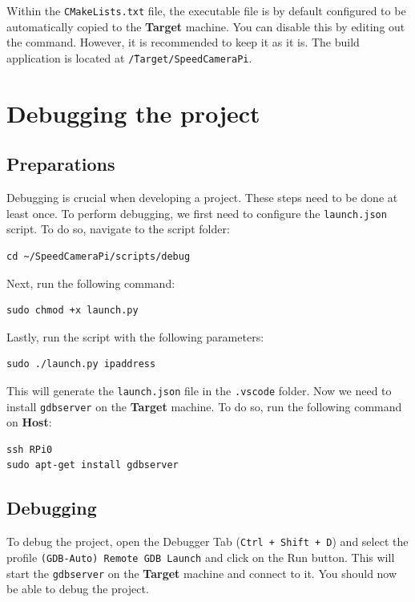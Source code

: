 Within the \texttt{CMakeLists.txt} file, the executable file is by default configured to be automatically copied to the \textbf{Target} machine. You can disable this by editing out the command. However, it is recommended to keep it as it is. The build application is located at \texttt{\~/Target/SpeedCameraPi}.

\section{Debugging the project}

\subsection{Preparations}

Debugging is crucial when developing a project. These steps need to be done at least once. To perform debugging, we first need to configure the \texttt{launch.json} script. To do so, navigate to the script folder:

\begin{lstlisting}
cd ~/SpeedCameraPi/scripts/debug
\end{lstlisting}

Next, run the following command:

\begin{lstlisting}
sudo chmod +x launch.py
\end{lstlisting}

Lastly, run the script with the following parameters:

\begin{lstlisting}
sudo ./launch.py ipaddress
\end{lstlisting}

This will generate the \texttt{launch.json} file in the \texttt{.vscode} folder. Now we need to install \texttt{gdbserver} on the \textbf{Target} machine. To do so, run the following command on \textbf{Host}:

\begin{lstlisting}
ssh RPi0
sudo apt-get install gdbserver
\end{lstlisting}

\subsection{Debugging}

To debug the project, open the Debugger Tab (\texttt{Ctrl + Shift + D}) and select the profile \texttt{(GDB-Auto) Remote GDB Launch} and click on the Run button. This will start the \texttt{gdbserver} on the \textbf{Target} machine and connect to it. You should now be able to debug the project.

